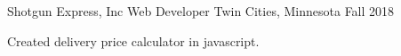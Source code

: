\begin{cventries}

  \cventry
    {Shotgun Express, Inc}
    {Web Developer}
    {Twin Cities, Minnesota} %
    {Fall 2018} %
    {
      \begin{cvitems} %
        \item {Created delivery price calculator in javascript.}
      \end{cvitems}
    }


\end{cventries}
